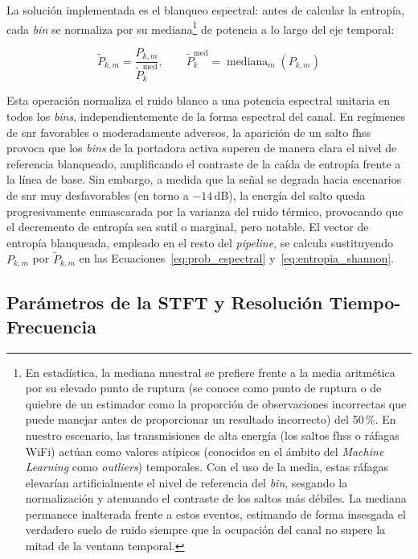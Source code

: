 La solución implementada es el blanqueo espectral: antes de calcular la entropía, cada \textit{bin} se normaliza por su mediana\footnote{En estadística, la mediana muestral se prefiere frente a la media aritmética por su elevado punto de ruptura (se conoce como punto de ruptura o de quiebre de un estimador como la proporción de observaciones incorrectas que puede manejar antes de proporcionar un resultado incorrecto) del 50\,\%. En nuestro escenario, las transmisiones de alta energía (los saltos \gls{fhss} o ráfagas WiFi) actúan como valores atípicos (conocidos en el ámbito del \textit{Machine Learning} como \textit{outliers}) temporales. Con el uso de la media, estas ráfagas elevarían artificialmente el nivel de referencia del \textit{bin}, sesgando la normalización y atenuando el contraste de los saltos más débiles. La mediana permanece inalterada frente a estos eventos, estimando de forma insesgada el verdadero suelo de ruido siempre que la ocupación del canal no supere la mitad de la ventana temporal.} de potencia a lo largo del eje temporal:

\begin{equation}
    \tilde{P}_{k,m} = \frac{P_{k,m}}{\tilde{P}_{k}^{\text{med}}}, \qquad \tilde{P}_{k}^{\text{med}} = \operatorname{mediana}_{m}\!\left(P_{k,m}\right)
    \label{eq:whitening}
\end{equation}

Esta operación normaliza el ruido blanco a una potencia espectral unitaria en todos los \textit{bins}, independientemente de la forma espectral del canal. En regímenes de \gls{snr} favorables o moderadamente adversos, la aparición de un salto \gls{fhss} provoca que los \textit{bins} de la portadora activa superen de manera clara el nivel de referencia blanqueado, amplificando el contraste de la caída de entropía frente a la línea de base. Sin embargo, a medida que la señal se degrada hacia escenarios de \gls{snr} muy desfavorables (en torno a $-14$\,dB), la energía del salto queda progresivamente enmascarada por la varianza del ruido térmico, provocando que el decremento de entropía sea sutil o marginal, pero notable. El vector de entropía blanqueada, empleado en el resto del \textit{pipeline}, se calcula sustituyendo $P_{k,m}$ por $\tilde{P}_{k,m}$ en las Ecuaciones~\ref{eq:prob_espectral} y~\ref{eq:entropia_shannon}.

\subsection{Parámetros de la STFT y Resolución Tiempo-Frecuencia}
\label{subsec:parametros_stft}

